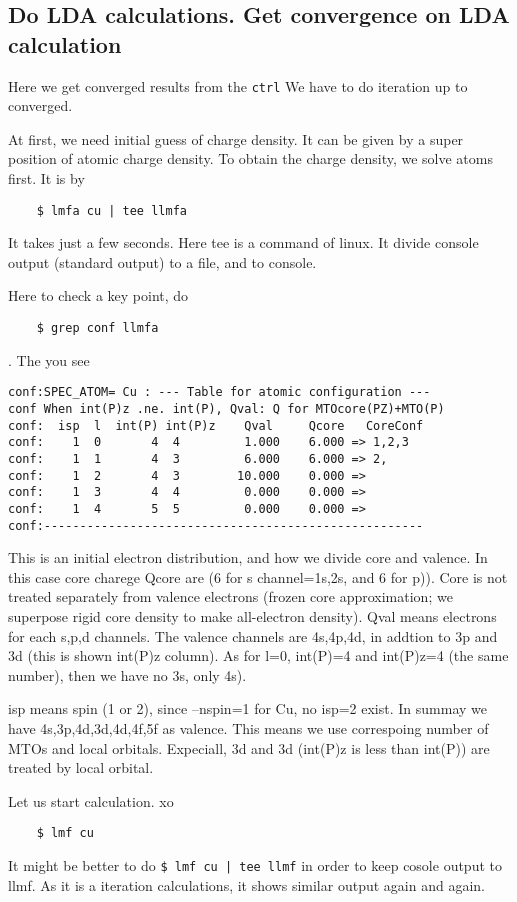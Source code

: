 \documentclass[a4paper,10pt,epsf,fleqn]{article}
\begin{document}
\subsection{Do LDA calculations. Get convergence on LDA calculation}
\label{lm7K-scf}
Here we get converged results from the \verb+ctrl+
We have to do iteration up to converged.

At first, we need initial guess of charge density.
It can be given by a super position of atomic charge density.
To obtain the charge density, we solve atoms first. It is by
\begin{verbatim}
    $ lmfa cu | tee llmfa
\end{verbatim}
It takes just a few seconds.
Here tee is a command of linux.
It divide console output (standard output) to a file, and to console.

Here to check a key point, do
\begin{verbatim}
    $ grep conf llmfa
\end{verbatim}
. The you see
\begin{verbatim}
conf:SPEC_ATOM= Cu : --- Table for atomic configuration ---
conf When int(P)z .ne. int(P), Qval: Q for MTOcore(PZ)+MTO(P)
conf:  isp  l  int(P) int(P)z    Qval     Qcore   CoreConf
conf:    1  0       4  4         1.000    6.000 => 1,2,3
conf:    1  1       4  3         6.000    6.000 => 2,
conf:    1  2       4  3        10.000    0.000 => 
conf:    1  3       4  4         0.000    0.000 => 
conf:    1  4       5  5         0.000    0.000 => 
conf:-----------------------------------------------------
\end{verbatim}
This is an initial electron distribution, and how we divide 
core and valence. In this case core charege Qcore are (6 for s channel=1s,2s, 
and 6 for p)). Core is not treated separately from valence electrons
(frozen core approximation; we superpose rigid core density to make
all-electron density). Qval means electrons for each s,p,d channels.
The valence channels are 4s,4p,4d, in addtion to 3p and 3d
(this is shown int(P)z column). As for l=0, int(P)=4 and int(P)z=4
(the same number), then we have no 3s, only 4s).

isp means spin (1 or 2), since --nspin=1 for Cu, no isp=2 exist.
In summay we have 4s,3p,4d,3d,4d,4f,5f as valence. 
This means we use correspoing number of MTOs and local orbitals.
Expeciall, 3d and 3d (int(P)z is less than int(P)) are treated by
local orbital.


Let us start calculation.
xo\begin{verbatim}
    $ lmf cu
\end{verbatim}
It might be better to do
\verb+$ lmf cu | tee llmf+
in order to keep cosole output to llmf.
As it is a iteration calculations, it shows similar output again and again.
\end{document}
